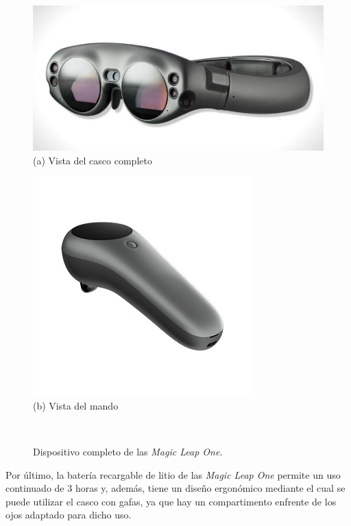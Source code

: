 \begin{figure}[htbp]
\centering
    \hspace{-4mm}
    \begin{minipage}{0.5\textwidth}
        \centering
        \includegraphics[scale=0.8]{Images/Estado del arte/magicleapone1.jpg}\\
        (a) Vista del casco completo
    \end{minipage}
    \begin{minipage}{0.5\textwidth}
        \centering
        \includegraphics[scale=0.3]{Images/Estado del arte/magicleapone2.jpg}\\
       (b) Vista del mando
    \end{minipage}\\
    \caption[Dispositivo completo de las \textit{Magic Leap One}]{Dispositivo completo de las \textit{Magic Leap One}\footnotemark.}
    \label{fig:vistasMagicLeapnOne}
\end{figure}


Por último, la batería recargable de litio de las \textit{Magic Leap One} permite un uso continuado de 3 horas y, además, tiene un diseño ergonómico mediante el cual se puede utilizar el casco con gafas, ya que hay un compartimento enfrente de los ojos adaptado para dicho uso.


